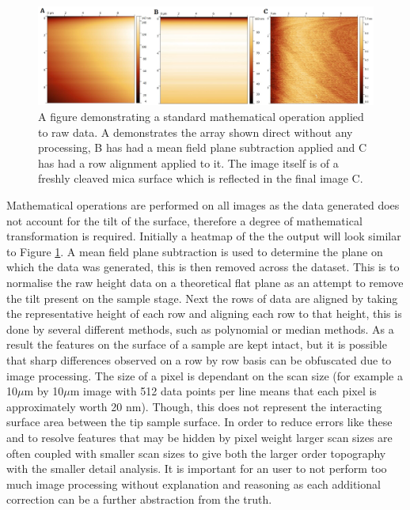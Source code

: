\begin{figure}[h!]     %
        \begin{center}
          \includegraphics[width=140mm]{chapter2/MathOp.png}
\end{center}
\caption{A figure demonstrating a standard mathematical operation applied to raw data. A demonstrates the array shown direct without any processing, B has had a mean field plane subtraction applied and C has had a row alignment applied to it. The image itself is of a freshly cleaved mica surface which is reflected in the final image C.}
\label{fig:MathOp}                 %
\end{figure}

Mathematical operations are performed on all images as the data generated does not account for the tilt of the surface, therefore a degree of mathematical transformation is required. Initially a heatmap of the the output will look similar to Figure \ref{fig:MathOp}. A mean field plane subtraction is used to determine the plane on which the data was generated, this is then removed across the dataset. This is to normalise the raw height data on a theoretical flat plane as an attempt to remove the tilt present on the sample stage. Next the rows of data are aligned by taking the representative height of each row and aligning each row to that height, this is done by several different methods, such as polynomial or median methods. As a result the features on the surface of a sample are kept intact, but it is possible that sharp differences observed on a row by row basis can be obfuscated due to image processing. The size of a pixel is dependant on the scan size (for example a 10$\mu$m by 10$\mu$m image with 512 data points per line means that each pixel is approximately worth 20 nm). Though, this does not represent the interacting surface area between the tip sample surface. In order to reduce errors like these and to resolve features that may be hidden by pixel weight larger scan sizes are often coupled with smaller scan sizes to give both the larger order topography with the smaller detail analysis. It is important for an user to not perform too much image processing without explanation and reasoning as each additional correction can be a further abstraction from the truth.

